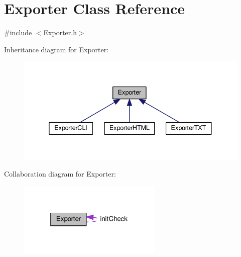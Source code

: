 \hypertarget{class_exporter}{}\section{Exporter Class Reference}
\label{class_exporter}


{\ttfamily \#include $<$Exporter.\+h$>$}



Inheritance diagram for Exporter\+:
\nopagebreak
\begin{figure}[H]
\begin{center}
\leavevmode
\includegraphics[width=338pt]{class_exporter__inherit__graph}
\end{center}
\end{figure}


Collaboration diagram for Exporter\+:
\nopagebreak
\begin{figure}[H]
\begin{center}
\leavevmode
\includegraphics[width=196pt]{class_exporter__coll__graph}
\end{center}
\end{figure}

